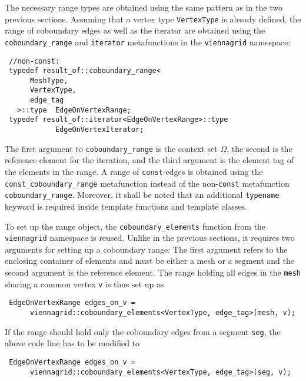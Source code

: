 The necessary range types are obtained using the same pattern as in the two previous sections.
Assuming that a vertex type \lstinline|VertexType| is already defined, the range of coboundary edges as well as the iterator are obtained
using the \lstinline|coboundary_range| and \lstinline|iterator| metafunctions in the \lstinline|viennagrid| namespace:
\begin{lstlisting}
 //non-const:
 typedef result_of::coboundary_range<
      MeshType,
      VertexType,
      edge_tag
   >::type  EdgeOnVertexRange;
 typedef result_of::iterator<EdgeOnVertexRange>::type
            EdgeOnVertexIterator;
\end{lstlisting}
The first argument to \lstinline|coboundary_range| is the context set $\Omega$, the second is the reference element for the iteration, and the third argument is the element tag of the elements in the range.
A range of \lstinline|const|-edges is obtained using the \lstinline|const_coboundary_range| metafunction instead of the non-\lstinline|const| metafunction \lstinline|coboundary_range|.
Moreover, it shall be noted that an additional \lstinline|typename| keyword is required inside template functions and template classes.

To set up the range object, the \lstinline|coboundary_elements| function from the \lstinline|viennagrid| namespace is reused. Unlike in the previous sections, it requires two arguments
for setting up a coboundary range: The first argument refers to the enclosing container of elements and must be either a mesh or a segment and the second argument is the reference element.
The range holding all edges in the \lstinline|mesh| sharing a common vertex \lstinline|v| is thus set up as
\begin{lstlisting}
 EdgeOnVertexRange edges_on_v =
      viennagrid::coboundary_elements<VertexType, edge_tag>(mesh, v);
\end{lstlisting}

\pagebreak

If the range should hold only the coboundary edges from a segment \lstinline|seg|, the above code line has to be modified to
\begin{lstlisting}
 EdgeOnVertexRange edges_on_v =
      viennagrid::coboundary_elements<VertexType, edge_tag>(seg, v);
\end{lstlisting}

